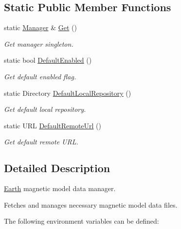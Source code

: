 \subsection*{Static Public Member Functions}
\begin{DoxyCompactItemize}
\item 
static \hyperlink{classlibrary_1_1physics_1_1environment_1_1magnetic_1_1earth_1_1_manager}{Manager} \& \hyperlink{classlibrary_1_1physics_1_1environment_1_1magnetic_1_1earth_1_1_manager_a61dcc0186b95a95dfdbec9bf1e285c5a}{Get} ()
\begin{DoxyCompactList}\small\item\em Get manager singleton. \end{DoxyCompactList}\item 
static bool \hyperlink{classlibrary_1_1physics_1_1environment_1_1magnetic_1_1earth_1_1_manager_a814a799750a890606ac9ecbd4fe35fff}{Default\+Enabled} ()
\begin{DoxyCompactList}\small\item\em Get default enabled flag. \end{DoxyCompactList}\item 
static Directory \hyperlink{classlibrary_1_1physics_1_1environment_1_1magnetic_1_1earth_1_1_manager_a2d7532e36f80abf29d2e60bc565a5cc5}{Default\+Local\+Repository} ()
\begin{DoxyCompactList}\small\item\em Get default local repository. \end{DoxyCompactList}\item 
static U\+RL \hyperlink{classlibrary_1_1physics_1_1environment_1_1magnetic_1_1earth_1_1_manager_af27590c795dd6b87166b84495b777d2f}{Default\+Remote\+Url} ()
\begin{DoxyCompactList}\small\item\em Get default remote U\+RL. \end{DoxyCompactList}\end{DoxyCompactItemize}


\subsection{Detailed Description}
\hyperlink{classlibrary_1_1physics_1_1environment_1_1magnetic_1_1_earth}{Earth} magnetic model data manager. 

Fetches and manages necessary magnetic model data files.

The following environment variables can be defined\+:


